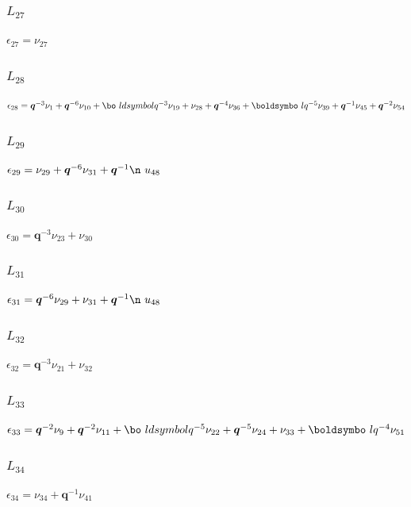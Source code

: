 \subsubsection*{$L_{27}$}
$
\epsilon_{27} = \nu_{27}
$

\subsubsection*{$L_{28}$}
$
\epsilon_{28} = \boldsymbol{q}^{-3}\nu_{1} + \boldsymbol{q}^{-6}\nu_{10} + \bo\
ldsymbol{q}^{-3}\nu_{19} + \nu_{28} + \boldsymbol{q}^{-4}\nu_{36} + \boldsymbo\
l{q}^{-5}\nu_{39} + \boldsymbol{q}^{-1}\nu_{45} + \boldsymbol{q}^{-2}\nu_{54}
$

\subsubsection*{$L_{29}$}
$
\epsilon_{29} = \nu_{29} + \boldsymbol{q}^{-6}\nu_{31} + \boldsymbol{q}^{-1}\n\
u_{48}
$

\subsubsection*{$L_{30}$}
$
\epsilon_{30} = \boldsymbol{q}^{-3}\nu_{23} + \nu_{30}
$

\subsubsection*{$L_{31}$}
$
\epsilon_{31} = \boldsymbol{q}^{-6}\nu_{29} + \nu_{31} + \boldsymbol{q}^{-1}\n\
u_{48}
$

\subsubsection*{$L_{32}$}
$
\epsilon_{32} = \boldsymbol{q}^{-3}\nu_{21} + \nu_{32}
$

\subsubsection*{$L_{33}$}
$
\epsilon_{33} = \boldsymbol{q}^{-2}\nu_{9} + \boldsymbol{q}^{-2}\nu_{11} + \bo\
ldsymbol{q}^{-5}\nu_{22} + \boldsymbol{q}^{-5}\nu_{24} + \nu_{33} + \boldsymbo\
l{q}^{-4}\nu_{51}
$

\subsubsection*{$L_{34}$}
$
\epsilon_{34} = \nu_{34} + \boldsymbol{q}^{-1}\nu_{41}
$

